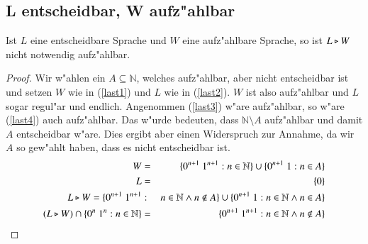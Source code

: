 \subsection{L entscheidbar, W aufz"ahlbar}

\begin{satz}
Ist $L$ eine entscheidbare Sprache und $W$ eine aufz"ahlbare Sprache, so ist $L\triangleright W$ nicht notwendig aufz"ahlbar.
\end{satz}
\begin{proof}
Wir w"ahlen ein $A\subseteq \mathbb{N}$, welches aufz"ahlbar, aber nicht entscheidbar ist und
setzen $W$ wie in (\ref{last1}) und $L$ wie in (\ref{last2}). $W$ ist also aufz"ahlbar und $L$ sogar regul"ar und endlich.
Angenommen (\ref{last3}) w"are aufz"ahlbar, so w"are (\ref{last4}) auch aufz"ahlbar. Das w"urde bedeuten, dass $\mathbb{N}\setminus A$ aufz"ahlbar und damit $A$ entscheidbar w"are. Dies ergibt aber einen Widerspruch zur Annahme, da wir $A$ so gew"ahlt haben, dass es nicht entscheidbar ist.
\setcounter{equation}{0}
\begin{eqnarray}
W&=&\{0^{n+1}\ 1^{n+1} : n\in \mathbb{N} \} \cup \{0^{n+1}\ 1 : n\in A \} \label{last1} \\
L&=&\{0\} \label{last2} \\
L\ff W = \{0^{n+1}\ 1^{n+1} &:& n\in\mathbb{N} \wedge n\notin A\} \cup \{0^{n+1}\ 1:n\in \mathbb{N} \wedge n\in A\} \label{last3} \\
(L\ff W)\cap \{0^n\ 1^n : n\in \mathbb{N}\} &=& \{0^{n+1}\ 1^{n+1} : n\in \mathbb{N} \wedge n\notin A\} \label{last4} 
\end{eqnarray}
\end{proof}
